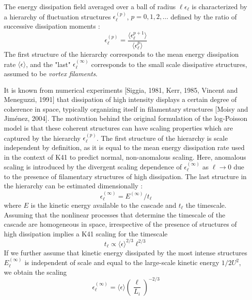The energy dissipation field averaged over a ball of radius $\ell\epsilon_\ell$ is characterized by a hierarchy of fluctuation structures $\epsilon_\ell^{(p)}$, $p=0,1,2,\dots$ defined by the ratio of successive dissipation moments :
\begin{equation}
    \epsilon_\ell^{(p)}=\frac{\langle\epsilon_\ell^{p+1}\rangle}{\langle\epsilon_\ell^p\rangle}
\end{equation}
The first structure of the hierarchy corresponds to the mean energy dissipation rate $\langle\epsilon\rangle$, and the "last" $\epsilon_\ell^{(\infty)}$ corresponds to the small scale dissipative structures, assumed to be \emph{vortex filaments}.

It is known from numerical experiments [Siggia, 1981, Kerr, 1985, Vincent and Meneguzzi, 1991] that dissipation of high intensity displays a certain degree of coherence in space, typically organizing itself in filamentary structures [Moisy and Jiménez, 2004]. The motivation behind the original formulation of the log-Poisson model is that these coherent structures can have scaling properties which are captured by the hierarchy $\epsilon_\ell^{(p)}$.
The first structure of the hierarchy is scale independent by definition, as it is equal to the mean energy dissipation rate used in the context of K41 to predict normal, non-anomalous scaling. Here, anomalous scaling is introduced by the divergent scaling dependence of $\epsilon_\ell^{(\infty)}$ as $ \ell\rightarrow0$ due to the presence of filamentary
structures of high dissipation. The last structure in the hierarchy can be estimated dimensionally :
\begin{equation}
    \epsilon_\ell^{(\infty)}=E^{(\infty)}/t_\ell
\end{equation}
where $E$ is the kinetic energy available to the cascade and $t_\ell$ the timescale.
Assuming that the nonlinear processes that determine the timescale of the cascade are homogeneous in space, irrespective of the presence of structures of high dissipation implies a K41 scaling for the timescale
\begin{equation}
    t_\ell\propto\langle\epsilon\rangle^{2/3}\ell^{2/3}
\end{equation}
If we further assume that kinetic energy dissipated by the most intense structures $E_\ell^{(\infty)}$ is independent of scale and equal to the large-scale kinetic energy $1/2U^2$, we obtain the scaling
\begin{equation}
    \epsilon_\ell^{(\infty)}=\langle\epsilon\rangle\left(\frac{\ell}{L_i}\right)^{-2/3}
\end{equation}
